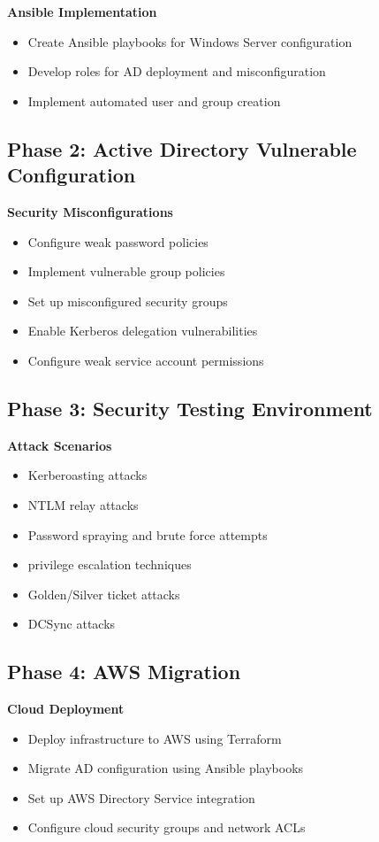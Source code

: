 \documentclass[11pt,a4paper]{article}
\begin{document}
\textbf{Ansible Implementation}
\begin{itemize}
    \item Create Ansible playbooks for Windows Server configuration
    \item Develop roles for AD deployment and misconfiguration
    \item Implement automated user and group creation
\end{itemize}

\subsection{Phase 2: Active Directory Vulnerable Configuration}
\textbf{Security Misconfigurations}
\begin{itemize}
    \item Configure weak password policies
    \item Implement vulnerable group policies
    \item Set up misconfigured security groups
    \item Enable Kerberos delegation vulnerabilities
    \item Configure weak service account permissions
\end{itemize}

\subsection{Phase 3: Security Testing Environment}
\textbf{Attack Scenarios}
\begin{itemize}
    \item Kerberoasting attacks
    \item NTLM relay attacks
    \item Password spraying and brute force attempts
    \item privilege escalation techniques
    \item Golden/Silver ticket attacks
    \item DCSync attacks
\end{itemize}

\subsection{Phase 4: AWS Migration}
\textbf{Cloud Deployment}
\begin{itemize}
    \item Deploy infrastructure to AWS using Terraform
    \item Migrate AD configuration using Ansible playbooks
    \item Set up AWS Directory Service integration
    \item Configure cloud security groups and network ACLs
\end{itemize}
\end{document}
